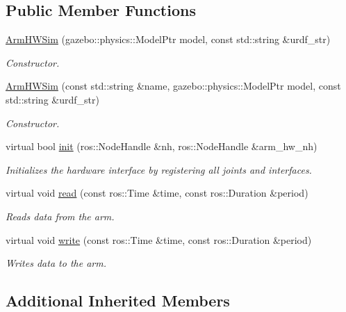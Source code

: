 \subsection*{Public Member Functions}
\begin{DoxyCompactItemize}
\item 
\hyperlink{classuwrt_1_1arm_1_1_arm_h_w_sim_aaa787422131f1db3f639e5905545a839}{Arm\+H\+W\+Sim} (gazebo\+::physics\+::\+Model\+Ptr model, const std\+::string \&urdf\+\_\+str)
\begin{DoxyCompactList}\small\item\em Constructor. \end{DoxyCompactList}\item 
\hyperlink{classuwrt_1_1arm_1_1_arm_h_w_sim_ac0764d307f3b885dccc49c36545dfcd3}{Arm\+H\+W\+Sim} (const std\+::string \&name, gazebo\+::physics\+::\+Model\+Ptr model, const std\+::string \&urdf\+\_\+str)
\begin{DoxyCompactList}\small\item\em Constructor. \end{DoxyCompactList}\item 
virtual bool \hyperlink{classuwrt_1_1arm_1_1_arm_h_w_sim_ab099f7bf8a4a9b27d8699f61c71ad30e}{init} (ros\+::\+Node\+Handle \&nh, ros\+::\+Node\+Handle \&arm\+\_\+hw\+\_\+nh)
\begin{DoxyCompactList}\small\item\em Initializes the hardware interface by registering all joints and interfaces. \end{DoxyCompactList}\item 
virtual void \hyperlink{classuwrt_1_1arm_1_1_arm_h_w_sim_a78eb2303fba768155763a25797c0eecf}{read} (const ros\+::\+Time \&time, const ros\+::\+Duration \&period)
\begin{DoxyCompactList}\small\item\em Reads data from the arm. \end{DoxyCompactList}\item 
virtual void \hyperlink{classuwrt_1_1arm_1_1_arm_h_w_sim_aa334fca03f76265ca8ec2da3be53991f}{write} (const ros\+::\+Time \&time, const ros\+::\+Duration \&period)
\begin{DoxyCompactList}\small\item\em Writes data to the arm. \end{DoxyCompactList}\end{DoxyCompactItemize}
\subsection*{Additional Inherited Members}


